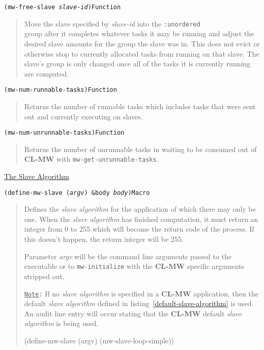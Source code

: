 \documentclass[titlepage,12pt]{book}
\newcommand{\xsmall}{\latexhtml{\small}{}}
\newcommand{\xnormalsize}{\latexhtml{\normalsize}{}}
\newcommand{\clmw}{\xsmall\textbf{CL-MW}\xnormalsize\xspace}
\newcommand{\sa}{\textit{slave algorithm}\xspace}
\newcommand{\un}{\texttt{:unordered}\xspace}
\newcommand{\func}[1]{\xsmall\mbox{\uppercase{\texttt{#1}}}\xnormalsize\xspace}
\newcommand{\Note}{\texttt{\underline{Note}:}\xspace}
\newcommand{\apiheader}[1]{\begin{center}\underline{#1}\end{center}}
\newcommand{\apifunc}[2]{\noindent\xsmall\texttt{(#1)}\hspace*{\fill}\xnormalsize\texttt{#2}}
\newenvironment{apientry}[2]
	{\apifunc{#1}{#2}\begin{quotation}}
	{\end{quotation}}
\begin{document}
\begin{apientry}
{mw-free-slave \emph{slave-id}}
{Function}
Move the slave specified by \emph{slave-id} into the \un \\ group
after it completes whatever tasks it may be running and adjust the
desired slave amounts for the group the slave was in. This does not
evict or otherwise stop to currently allocated tasks from running on
that slave. The slave's group is only changed once all of the tasks
it is currently running are computed.  \end{apientry}

\begin{apientry}
{mw-num-runnable-tasks}
{Function}
Returns the number of runnable tasks which includes tasks that were
sent out and currently executing on slaves.
\end{apientry}

\begin{apientry}
{mw-num-unrunnable-tasks}
{Function}
Returns the number of unrunnable tasks in waiting to be consumed out
of \clmw with \func{mw-get-unrunnable-tasks}.
\end{apientry}

\apiheader{The Slave Algorithm}
\begin{apientry}
{define-mw-slave (\emph{argv}) \&body \emph{body}}
{Macro}
Defines the \sa for the application of which there may only be one.
When the \sa has finished computation, it must return an integer from 0 to 255
which will become the return code of the process. If this doesn't happen,
the return integer will be 255.

Parameter \emph{argv} will be the command line arguments passed to
the executable or to \func{mw-initialize} with the \clmw specific
arguments stripped out.

\Note If no \sa is specified in a \clmw application, then the default \sa
defined in listing~\ref{default-slave-algorithm} is used. An audit line
entry will occur stating that the \clmw default \sa is being used.

\begin{lisp}[label=default-slave-algorithm,caption=Default Slave Algorithm]
(define-mw-slave (argv)
  (mw-slave-loop-simple))
\end{lisp}

\end{apientry}
\end{document}
